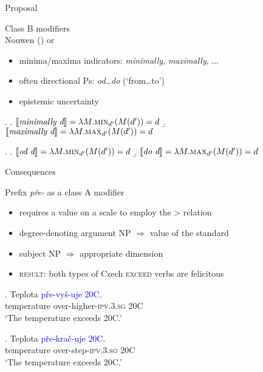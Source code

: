 \documentclass[12pt]{beamer}
\begin{document}
\begin{frame}{Proposal}

Class B modifiers\\
\scriptsize Nouwen (\citeyear{nouwen2010two}) or \cite{brasoveanu2012modified}\normalsize

\begin{itemize}
\item minima/maxima indicators: \textit{minimally}, \textit{maximally}, ...
\item often directional Ps: \textit{od}\dots \textit{do} (`from\dots to')
\item epistemic uncertainty 
\end{itemize}

\ex. \a. $\llbracket\textit{minimally~d}\rrbracket=\lambda M.\textsc{min}_{d'}(M(d'))=d$
\b. $\llbracket\textit{maximally~d}\rrbracket=\lambda M.\textsc{max}_{d'}(M(d'))=d$

\ex. \a. $\llbracket\textit{od~d}\rrbracket=\lambda M.\textsc{min}_{d'}(M(d'))=d$
\b. $\llbracket\textit{do~d}\rrbracket=\lambda M.\textsc{max}_{d'}(M(d'))=d$

\end{frame}

\begin{frame}{Consequences}

Prefix \textit{pře-} as a class A modifier 

\begin{itemize}
\item requires a value on a scale to employ the > relation
\item degree-denoting argument NP $\Rightarrow$ value of the standard  
\item subject NP $\Rightarrow$ appropriate dimension  
\item \textsc{result}: both types of Czech \textsc{exceed} verbs are felicitous
\end{itemize}

\exg. Teplota \textcolor{blue}{pře-vyš-uje} \textcolor{blue}{20\degree C}.\label{ex:ExVs-degrees}\\
temperature over-higher-\textsc{ipv.3.sg} 20\degree C\\
`The temperature exceeds 20\degree C.'

\exg. Teplota \textcolor{blue}{pře-krač-uje} \textcolor{blue}{20\degree C}.\\
temperature over-step-\textsc{ipv.3.sg} 20\degree C\\
`The temperature exceeds 20\degree C.'

\end{frame}
\end{document}
